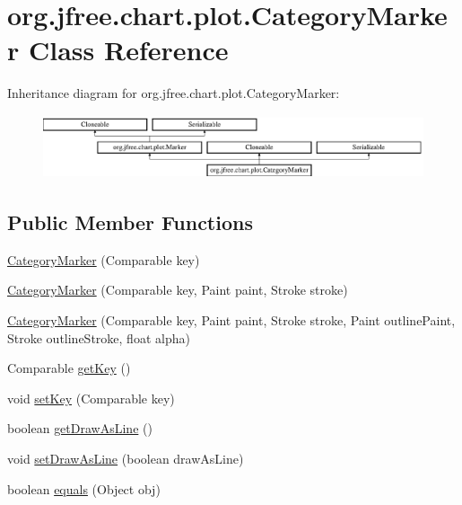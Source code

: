 \hypertarget{classorg_1_1jfree_1_1chart_1_1plot_1_1_category_marker}{}\section{org.\+jfree.\+chart.\+plot.\+Category\+Marker Class Reference}
\label{classorg_1_1jfree_1_1chart_1_1plot_1_1_category_marker}
Inheritance diagram for org.\+jfree.\+chart.\+plot.\+Category\+Marker\+:\begin{figure}[H]
\begin{center}
\leavevmode
\includegraphics[height=1.883408cm]{classorg_1_1jfree_1_1chart_1_1plot_1_1_category_marker}
\end{center}
\end{figure}
\subsection*{Public Member Functions}
\begin{DoxyCompactItemize}
\item 
\mbox{\hyperlink{classorg_1_1jfree_1_1chart_1_1plot_1_1_category_marker_a754cdb5a49318c626690951db8f4a064}{Category\+Marker}} (Comparable key)
\item 
\mbox{\hyperlink{classorg_1_1jfree_1_1chart_1_1plot_1_1_category_marker_a42b35d6c2d67ea22901d062bbd28ffd5}{Category\+Marker}} (Comparable key, Paint paint, Stroke stroke)
\item 
\mbox{\hyperlink{classorg_1_1jfree_1_1chart_1_1plot_1_1_category_marker_ac75cd36b121108e8f0c4b75bb07de265}{Category\+Marker}} (Comparable key, Paint paint, Stroke stroke, Paint outline\+Paint, Stroke outline\+Stroke, float alpha)
\item 
Comparable \mbox{\hyperlink{classorg_1_1jfree_1_1chart_1_1plot_1_1_category_marker_ab648c3388fd7fbd313696648b42623fd}{get\+Key}} ()
\item 
void \mbox{\hyperlink{classorg_1_1jfree_1_1chart_1_1plot_1_1_category_marker_a5af2af9a6e6c4e0cc7c3425d8fcd6b66}{set\+Key}} (Comparable key)
\item 
boolean \mbox{\hyperlink{classorg_1_1jfree_1_1chart_1_1plot_1_1_category_marker_a73bf61c934275f5c7563aab1c4a84203}{get\+Draw\+As\+Line}} ()
\item 
void \mbox{\hyperlink{classorg_1_1jfree_1_1chart_1_1plot_1_1_category_marker_a6fdcb06485ceec2d647dbab584270e8f}{set\+Draw\+As\+Line}} (boolean draw\+As\+Line)
\item 
boolean \mbox{\hyperlink{classorg_1_1jfree_1_1chart_1_1plot_1_1_category_marker_a3698bf3d50c565a6a6fa0c9c26acb0a7}{equals}} (Object obj)
\end{DoxyCompactItemize}
